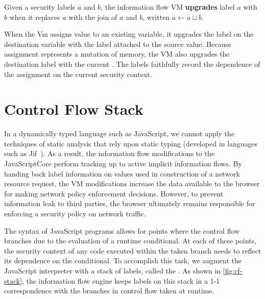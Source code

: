 \begin{definition}
  Given a security labels $a$ and $b$, the information flow VM {\bf upgrades} label $a$ with $b$ when it replaces $a$ with the join of $a$ and $b$, written $a \gets a \sqcup b$.
\end{definition}

When the Vm assigns value to an existing variable, it upgrades the label on the destination variable with the label attached to the source value.
Because assignment represents a mutation of memory, the VM also upgrades the destination label with the current \pclabel.
The labels faithfully record the dependence of the assignment on the current security context.


\section{Control Flow Stack}
\label{sec:control-flow-stack}

In a dynamically typed language such as JavaScript, we cannot apply the techniques of static analysis that rely upon static typing (developed in languages such as Jif~\cite{jif}).
As a result, the information flow modifications to the JavaScriptCore perform tracking up to active implicit information flows.
By handing back label information on values used in construction of a network resource request, the VM modifications increase the data available to the browser for making network policy enforcement decisions.
However, to prevent information leak to third parties, the browser ultimately remains responsible for enforcing a security policy on network traffic.

The syntax of JavaScript programs allows for points where the control flow branches due to the evaluation of a runtime conditional.
At each of these points, the security context of any code executed within the taken branch needs to reflect its dependence on the conditional.
To accomplish this task, we augment the JavaScript interpreter with a stack of labels, called the .
As shown in \autoref{fig:cf-stack}, the information flow engine keeps labels on this stack in a 1-1 correspondence with the branches in control flow taken at runtime.

